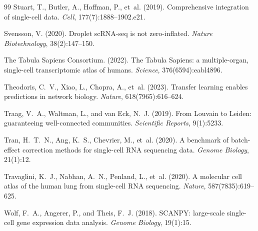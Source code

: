 \documentclass[unnumsec,webpdf,contemporary,large,namedate]{oup-authoring-template}
\begin{document}
\begin{thebibliography}{99}
Stuart, T., Butler, A., Hoffman, P., et~al. (2019).
\newblock Comprehensive integration of single-cell data.
\newblock \textit{Cell}, 177(7):1888--1902.e21.

Svensson, V. (2020).
\newblock Droplet scRNA-seq is not zero-inflated.
\newblock \textit{Nature Biotechnology}, 38(2):147--150.

{The Tabula Sapiens Consortium}. (2022).
\newblock The Tabula Sapiens: a multiple-organ, single-cell transcriptomic
  atlas of humans.
\newblock \textit{Science}, 376(6594):eabl4896.

Theodoris, C.~V., Xiao, L., Chopra, A., et~al. (2023).
\newblock Transfer learning enables predictions in network biology.
\newblock \textit{Nature}, 618(7965):616--624.

Traag, V.~A., Waltman, L., and van Eck, N.~J. (2019).
\newblock From Louvain to Leiden: guaranteeing well-connected communities.
\newblock \textit{Scientific Reports}, 9(1):5233.

Tran, H.~T.~N., Ang, K.~S., Chevrier, M., et~al. (2020).
\newblock A benchmark of batch-effect correction methods for single-cell RNA
  sequencing data.
\newblock \textit{Genome Biology}, 21(1):12.

Travaglini, K.~J., Nabhan, A.~N., Penland, L., et~al. (2020).
\newblock A molecular cell atlas of the human lung from single-cell RNA
  sequencing.
\newblock \textit{Nature}, 587(7835):619--625.

Wolf, F.~A., Angerer, P., and Theis, F.~J. (2018).
\newblock SCANPY: large-scale single-cell gene expression data analysis.
\newblock \textit{Genome Biology}, 19(1):15.

\end{thebibliography}
\end{document}
